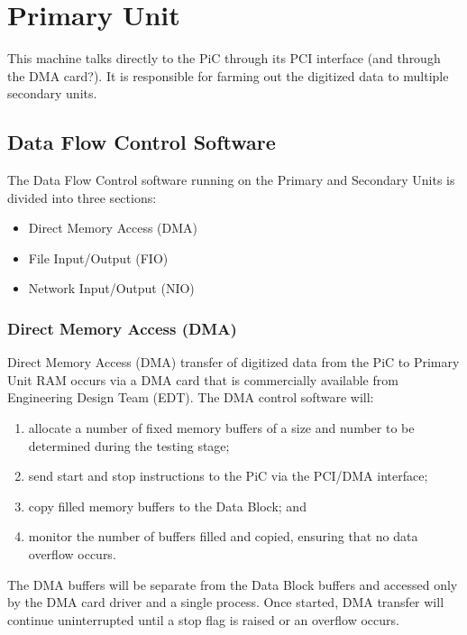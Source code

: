 
\chapter{Primary Unit}

This machine talks directly to the PiC through its PCI interface (and
through the DMA card?).  It is responsible for farming out the
digitized data to multiple secondary units.

\section{Data Flow Control Software}

The Data Flow Control software running on the Primary and Secondary
Units is divided into three sections:
\begin{itemize}
\item Direct Memory Access (DMA)
\item File Input/Output (FIO)
\item Network Input/Output (NIO)
\end{itemize}

\subsection{Direct Memory Access (DMA)}

Direct Memory Access (DMA) transfer of digitized data from the PiC to
Primary Unit RAM occurs via a DMA card that is commercially available
from Engineering Design Team (EDT).  The DMA control software will:

\begin{enumerate}

\item allocate a number of fixed memory buffers of a size and number
to be determined during the testing stage;

\item send start and stop instructions to the PiC via the PCI/DMA interface;

\item copy filled memory buffers to the Data Block; and

\item monitor the number of buffers filled and copied, ensuring that
no data overflow occurs.

\end{enumerate}

\noindent
The DMA buffers will be separate from the Data Block buffers and
accessed only by the DMA card driver and a single process.  Once
started, DMA transfer will continue uninterrupted until a stop flag is
raised or an overflow occurs.

